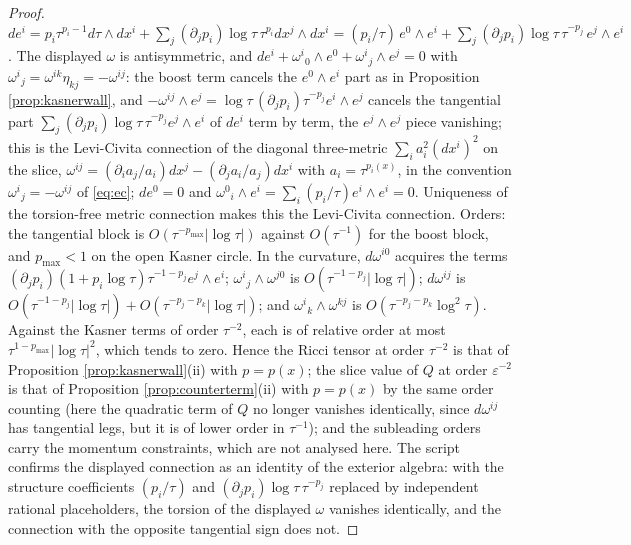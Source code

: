 \documentclass[11pt]{article}
\theoremstyle{definition}
\begin{document}
\begin{proof}
$de^i = p_i\tau^{p_i-1}d\tau\wedge dx^i + \sum_j(\partial_jp_i)\log\tau\,\tau^{p_i}dx^j\wedge dx^i = (p_i/\tau)\,e^0\wedge e^i + \sum_j(\partial_jp_i)\log\tau\,\tau^{-p_j}\,e^j\wedge e^i$. The displayed $\omega$ is antisymmetric, and $de^i + \omega^{i}{}_{0}\wedge e^0 + \omega^{i}{}_{j}\wedge e^j = 0$ with $\omega^{i}{}_{j} = \omega^{ik}\eta_{kj} = -\omega^{ij}$: the boost term cancels the $e^0\wedge e^i$ part as in Proposition \ref{prop:kasnerwall}, and $-\omega^{ij}\wedge e^j = \log\tau\,(\partial_jp_i)\tau^{-p_j}e^i\wedge e^j$ cancels the tangential part $\sum_j(\partial_jp_i)\log\tau\,\tau^{-p_j}e^j\wedge e^i$ of $de^i$ term by term, the $e^j\wedge e^j$ piece vanishing; this is the Levi-Civita connection of the diagonal three-metric $\sum_i a_i^2(dx^i)^2$ on the slice, $\omega^{ij} = (\partial_i a_j/a_i)dx^j - (\partial_j a_i/a_j)dx^i$ with $a_i = \tau^{p_i(x)}$, in the convention $\omega^{i}{}_{j} = -\omega^{ij}$ of \eqref{eq:ec}; $de^0 = 0$ and $\omega^{0}{}_{i}\wedge e^i = \sum_i(p_i/\tau)e^i\wedge e^i = 0$. Uniqueness of the torsion-free metric connection makes this the Levi-Civita connection. Orders: the tangential block is $O(\tau^{-p_{\max}}|\log\tau|)$ against $O(\tau^{-1})$ for the boost block, and $p_{\max} < 1$ on the open Kasner circle. In the curvature, $d\omega^{i0}$ acquires the terms $(\partial_jp_i)(1 + p_i\log\tau)\tau^{-1-p_j}e^j\wedge e^i$; $\omega^{i}{}_{j}\wedge\omega^{j0}$ is $O(\tau^{-1-p_j}|\log\tau|)$; $d\omega^{ij}$ is $O(\tau^{-1-p_j}|\log\tau|) + O(\tau^{-p_j-p_k}|\log\tau|)$; and $\omega^{i}{}_{k}\wedge\omega^{kj}$ is $O(\tau^{-p_j-p_k}\log^2\tau)$. Against the Kasner terms of order $\tau^{-2}$, each is of relative order at most $\tau^{1-p_{\max}}|\log\tau|^2$, which tends to zero. Hence the Ricci tensor at order $\tau^{-2}$ is that of Proposition \ref{prop:kasnerwall}(ii) with $p = p(x)$; the slice value of $Q$ at order $\varepsilon^{-2}$ is that of Proposition \ref{prop:counterterm}(ii) with $p = p(x)$ by the same order counting (here the quadratic term of $Q$ no longer vanishes identically, since $d\omega^{ij}$ has tangential legs, but it is of lower order in $\tau^{-1}$); and the subleading orders carry the momentum constraints, which are not analysed here. The script confirms the displayed connection as an identity of the exterior algebra: with the structure coefficients $(p_i/\tau)$ and $(\partial_jp_i)\log\tau\,\tau^{-p_j}$ replaced by independent rational placeholders, the torsion of the displayed $\omega$ vanishes identically, and the connection with the opposite tangential sign does not.
\end{proof}
\end{document}
